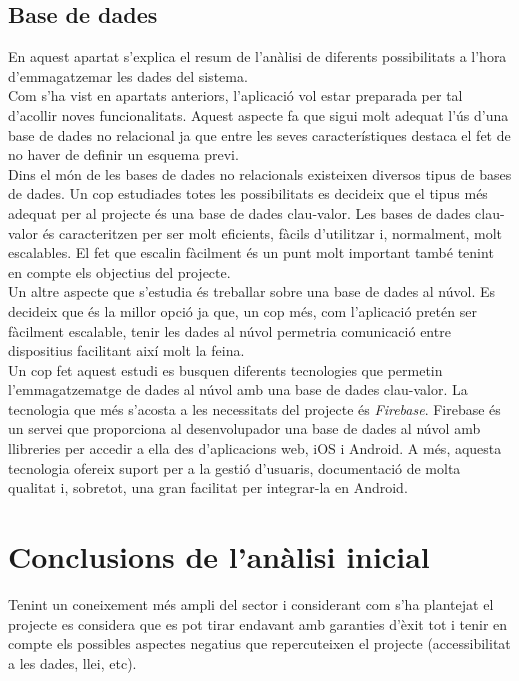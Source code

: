 \subsection{Base de dades}

En aquest apartat s'explica el resum de l'anàlisi de diferents possibilitats a l'hora d'emmagatzemar les dades del sistema.\\

Com s'ha vist en apartats anteriors, l'aplicació vol estar preparada per tal d'acollir noves funcionalitats. Aquest aspecte fa que sigui molt adequat l'ús d'una base de dades no relacional ja que entre les seves característiques destaca el fet de no haver de definir un esquema previ.\\

Dins el món de les bases de dades no relacionals existeixen diversos tipus de bases de dades. Un cop estudiades totes les possibilitats es decideix que el tipus més adequat per al projecte és una base de dades clau-valor. Les bases de dades clau-valor és caracteritzen per ser molt eficients, fàcils d'utilitzar i, normalment, molt escalables. El fet que escalin fàcilment és un punt molt important també tenint en compte els objectius del projecte.\\

Un altre aspecte que s'estudia és treballar sobre una base de dades al núvol. Es decideix que és la millor opció ja que, un cop més, com l'aplicació pretén ser fàcilment escalable, tenir les dades al núvol permetria comunicació entre dispositius facilitant així molt la feina.\\

Un cop fet aquest estudi es busquen diferents tecnologies que permetin l'emmagatzematge de dades al núvol amb una base de dades clau-valor. La tecnologia que més s'acosta a les necessitats del projecte és \textit{Firebase}. Firebase és un servei que proporciona al desenvolupador una base de dades al núvol amb llibreries per accedir a ella des d'aplicacions web, iOS i Android. A més, aquesta tecnologia ofereix suport per a la gestió d'usuaris, documentació de molta qualitat i, sobretot, una gran facilitat per integrar-la en Android.



\clearpage


\section{Conclusions de l'anàlisi inicial}

Tenint un coneixement més ampli del sector i considerant com s’ha plantejat
el projecte es considera que es pot tirar endavant amb garanties d’èxit tot i
tenir en compte els possibles aspectes negatius que repercuteixen el projecte
(accessibilitat a les dades, llei, etc).

